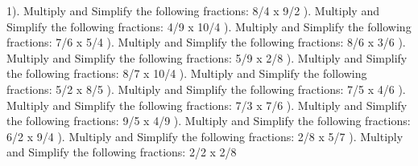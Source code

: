 \documentclass{article}%
\begin{document}
1). Multiply and Simplify the following fractions: 8/4 x 9/2%
\newline%
\newline%
). Multiply and Simplify the following fractions: 4/9 x 10/4%
\newline%
\newline%
). Multiply and Simplify the following fractions: 7/6 x 5/4%
\newline%
\newline%
). Multiply and Simplify the following fractions: 8/6 x 3/6%
\newline%
\newline%
). Multiply and Simplify the following fractions: 5/9 x 2/8%
\newline%
\newline%
). Multiply and Simplify the following fractions: 8/7 x 10/4%
\newline%
\newline%
). Multiply and Simplify the following fractions: 5/2 x 8/5%
\newline%
\newline%
). Multiply and Simplify the following fractions: 7/5 x 4/6%
\newline%
\newline%
). Multiply and Simplify the following fractions: 7/3 x 7/6%
\newline%
\newline%
). Multiply and Simplify the following fractions: 9/5 x 4/9%
\newline%
\newline%
). Multiply and Simplify the following fractions: 6/2 x 9/4%
\newline%
\newline%
). Multiply and Simplify the following fractions: 2/8 x 5/7%
\newline%
\newline%
). Multiply and Simplify the following fractions: 2/2 x 2/8%
\end{document}
